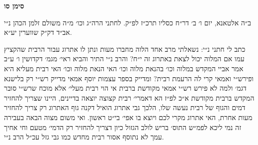\documentclass[12pt, openany]{book}
\newcommand{\chapname}{}
\newcommand{\newchap}[1]{
	\addcontentsline{toc}{chapter}{#1}
	\renewcommand{\chapname}{#1}
		\begin{center}
			\textbf{%
\fontsize{16pt}{16pt}\selectfont
				#1}
		\end{center}
}
\begin{document}
\newchap{סימן סו}
\begin{multicols}{2}
ב״ה אלטאנא, יום ו׳ ב׳ דר״ח כסליו תרכ״ז לפ״ק. לחתני הרה״ג וכו׳ מ״ה משולם זלמן הכהן נ״י אב״ד דק״ק שווערין יע״א.\\\vspace{0pt}

כתב לי חתני נ״י: נשאלתי מרב אחד הלוה מחברו מעות ונתן לו אתרוג עבור הרבית שהקציץ עמו אם המלוה יכול לצאת באתרוג זה י״ח? והרב נ״י התיר והביא ראי׳ מגמ׳ דקדושין ו׳ ע״ב אמר אביי המקדש במלוה וכו׳ בהנאת מלוה וכו׳ האי הנאת מלוה וכו׳ האי רבית מעליא היא ופירש״י ואמאי קרי לה הרעמת רבית? ומדייק בספר עצמות יוסף אמאי מדייק רש״י רק בלישנא דגמ׳ ולמה לא פירש רש״י אמאי מקודשת ברבית אי הוי רבית מעלי׳ אלא מוכח שרש״י סובר המקדש ברבית מקודשת א״כ לפ״ז הא דאמרי׳ רבית קצוצה יוצאה בדיינים, היינו שצריך להחזיר דמים והגוף של רבית נעשה שלו, הלכך גבי אתרוג הואיל דקנה גוף האתרוג רק צריך להחזיר מעות אחרת, האי אתרוג מקרי לכם ויוצא בו אפי׳ בי״ט ראשון. ואי משום מצוה הבאה בעבירה זה נמי ליכא לפמ״ש התוס׳ בריש לולב הגזול כיון דצריך להחזיר רק הדמי׳ מטעם וחי אחיך עמך לא נתוסף אסור רבית מחדש כמו גבי גזל עכ״ל הרב נ״י.\\\vspace{0pt}


\end{multicols}
\end{document}
